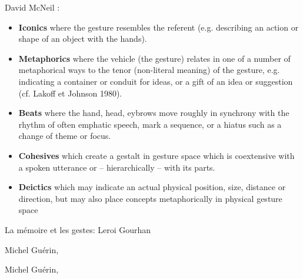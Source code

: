 \noindent David McNeil : 
\vspace{-1em}
\begin{itemize}[noitemsep]
\item \textbf{Iconics} where the gesture resembles the referent (e.g. describing an action or shape of an object with the hands).
\item \textbf{Metaphorics} where the vehicle (the gesture) relates in one of a number of metaphorical ways to the tenor (non-literal meaning) of the gesture, e.g. indicating a container or conduit for ideas, or a gift of an idea or suggestion (cf. Lakoff et Johnson 1980).
\item \textbf{Beats} where the hand, head, eybrows move roughly in synchrony with the rhythm of often emphatic speech, mark a sequence, or a hiatus such as a change of theme or focus.
\item \textbf{Cohesives} which create a gestalt in gesture space which is coextensive with a spoken utterance or – hierarchically – with its parts.
\item \textbf{Deictics} which may indicate an actual physical position, size, distance or direction, but may also place concepts metaphorically in physical gesture space
\end{itemize}


La mémoire et les gestes:
Leroi Gourhan

 Michel Guérin, \cite{guerin_philosophie_2018}


 Michel Guérin, \cite{guerin_philosophie_2018}










